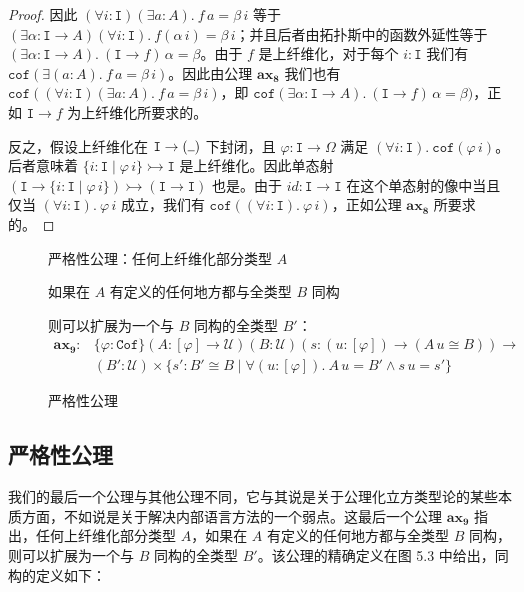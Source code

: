 \documentclass{ctexrep}
\theoremstyle{plain}
\theoremstyle{definition}
\theoremstyle{remark}
\newcommand{\Cof}{\mathtt{Cof}}
\newcommand{\ax}[1]{\mathbf{ax_{#1}}}
\newcommand{\ul}{{\rule[0ex]{0.5em}{0.4pt}}} %
\begin{document}
\begin{proof}
因此 $(\forall i : \mathtt{I})(\exists a : A).\ f\,a = \beta\,i$ 等于 $(\exists \alpha : \mathtt{I} \to A)(\forall i : \mathtt{I}).\ f(\alpha\,i) = \beta\,i$；并且后者由拓扑斯中的函数外延性等于 $(\exists \alpha : \mathtt{I} \to A).\ (\mathtt{I} \to f)\,\alpha = \beta$。由于 $f$ 是上纤维化，对于每个 $i : \mathtt{I}$ 我们有 $\mathtt{cof}(\exists(a : A).\ f\,a = \beta\,i)$。因此由公理 $\ax{8}$ 我们也有 $\mathtt{cof}((\forall i : \mathtt{I})(\exists a : A).\ f\,a = \beta\,i)$，即 $\mathtt{cof}(\exists \alpha : \mathtt{I} \to A).\ (\mathtt{I} \to f)\,\alpha = \beta)$，正如 $\mathtt{I} \to f$ 为上纤维化所要求的。

反之，假设上纤维化在 $\mathtt{I} \to (\ul )$ 下封闭，且 $\varphi : \mathtt{I} \to \Omega$ 满足 $(\forall i : \mathtt{I}).\ \mathtt{cof}(\varphi\,i)$。后者意味着 $\{i : \mathtt{I} \mid \varphi\,i\} \rightarrowtail \mathtt{I}$ 是上纤维化。因此单态射 $(\mathtt{I} \to \{i : \mathtt{I} \mid \varphi\,i\}) \rightarrowtail (\mathtt{I} \to \mathtt{I})$ 也是。由于 $id : \mathtt{I} \to \mathtt{I}$ 在这个单态射的像中当且仅当 $(\forall i : \mathtt{I}).\ \varphi\,i$ 成立，我们有 $\mathtt{cof}((\forall i : \mathtt{I}).\ \varphi\,i)$，正如公理 $\ax{8}$ 所要求的。
\end{proof}

\begin{figure}[htbp]
\centering

严格性公理：任何上纤维化部分类型 $A$

如果在 $A$ 有定义的任何地方都与全类型 $B$ 同构

则可以扩展为一个与 $B$ 同构的全类型 $B'$：
\begin{align*}
\ax{9} : &\{\varphi : \Cof\}(A : [\varphi] \to \mathcal{U})(B : \mathcal{U})(s : (u : [\varphi]) \to (A\,u \cong B)) \to \\
&(B' : \mathcal{U}) \times \{s' : B' \cong B \mid \forall(u : [\varphi]).\ A\,u = B' \land s\,u = s'\}
\end{align*}

\caption{严格性公理}
\label{fig:strictness-axiom}

\end{figure}

\subsection{严格性公理}

我们的最后一个公理与其他公理不同，它与其说是关于公理化立方类型论的某些本质方面，不如说是关于解决内部语言方法的一个弱点。这最后一个公理 $\ax{9}$ 指出，任何上纤维化部分类型 $A$，如果在 $A$ 有定义的任何地方都与全类型 $B$ 同构，则可以扩展为一个与 $B$ 同构的全类型 $B'$。该公理的精确定义在图 5.3 中给出，同构的定义如下：
\end{document}
